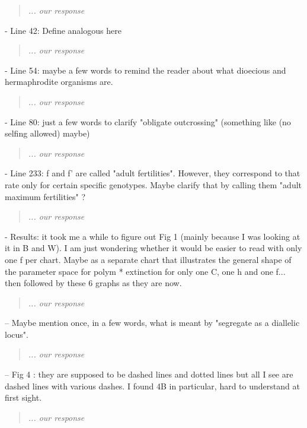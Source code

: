 \documentclass[11pt]{article}
\begin{document}
\begin{quote}
	{\itshape ... our response}
\end{quote}

- Line 42: Define analogous here

\begin{quote}
	{\itshape ... our response}
\end{quote}

- Line 54: maybe a few words to remind the reader about what dioecious and hermaphrodite organisms are.

\begin{quote}
	{\itshape ... our response}
\end{quote}

- Line 80: just a few words to clarify "obligate outcrossing" (something like (no selfing allowed) maybe)

\begin{quote}
	{\itshape ... our response}
\end{quote}

- Line 233: f and f’ are called "adult fertilities". However, they correspond to that rate only for certain specific genotypes. Maybe clarify that by calling them "adult maximum fertilities" ?

\begin{quote}
	{\itshape ... our response}
\end{quote}

- Results: it took me a while to figure out Fig 1 (mainly because I was looking at it in B and W). I am just wondering whether it would be easier to read with only one f per chart. Maybe as a separate chart that illustrates the general shape of the parameter space for polym * extinction for only one C, one h and one f... then followed by these 6 graphs as they are now.

\begin{quote}
	{\itshape ... our response}
\end{quote}

\noindent-- Maybe mention once, in a few words, what is meant by "segregate as a diallelic locus".
\begin{quote}
	{\itshape ... our response}
\end{quote}

\noindent-- Fig 4 : they are supposed to be dashed lines and dotted lines but all I see are dashed lines with various dashes. I found 4B in particular, hard to understand at first sight.

\begin{quote}
	{\itshape ... our response}
\end{quote}
\bigskip
\end{document}
